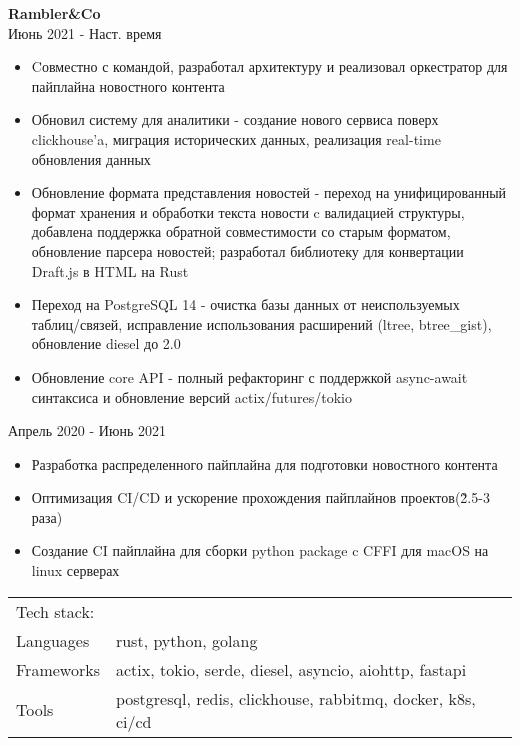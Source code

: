 \documentclass[a4paper]{article}
\begin{document}
\textbf{Rambler\&Co} \\
 \hfill Июнь 2021 - Наст. время\\
\vspace{-1mm}
\begin{itemize}[leftmargin=16pt,itemsep=0pt,topsep=2pt,label={-}]
    \item Cовместно с командой, разработал архитектуру и реализовал оркестратор для пайплайна новостного контента
    \item Обновил систему для аналитики - создание нового сервиса поверх clickhouse'a, миграция исторических данных, реализация real-time обновления данных
    \item Обновление формата представления новостей - переход на унифицированный формат хранения и обработки текста новости c валидацией структуры, добавлена поддержка обратной совместимости со старым форматом, обновление парсера новостей; разработал библиотеку для конвертации Draft.js в HTML на Rust
    \item Переход на PostgreSQL 14 - очистка базы данных от неиспользуемых таблиц/связей, исправление использования расширений (ltree, btree\_gist), обновление diesel до 2.0
    \item Обновление core API - полный рефакторинг с поддержкой async-await синтаксиса и обновление версий actix/futures/tokio
\end{itemize}
 \hfill Апрель 2020 - Июнь 2021\\
\begin{itemize}[leftmargin=16pt,itemsep=0pt,topsep=-8pt,label={-}]
    \item Разработка распределенного пайплайна для подготовки новостного контента
    \item Оптимизация CI/CD и ускорение прохождения пайплайнов проектов(\~2.5-3 раза)
    \item Создание CI пайплайна для сборки python package c CFFI для macOS на linux серверах
\end{itemize}
\begin{table}[h!]
    \begin{tabular}{ l l }
        Tech stack:& \\
        Languages  & rust, python, golang \\
        Frameworks & actix, tokio, serde, diesel, asyncio, aiohttp, fastapi \\
        Tools      & postgresql, redis, clickhouse, rabbitmq, docker, k8s, ci/cd \\
    \end{tabular}
\end{table}
\end{document}
